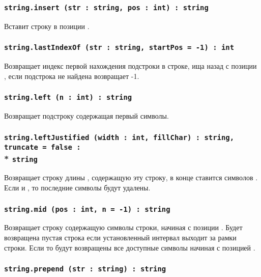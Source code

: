 \subsubsection{\lstinline|string.insert (str : string, pos : int) : string|}

Вставит строку  в позиции .

\subsubsection{\lstinline|string.lastIndexOf (str : string, startPos = -1) : int|}

Возвращает индекс первой нахождения подстроки  в строке, ища назад с позиции , если подстрока не найдена возвращает -1.

\subsubsection{\lstinline|string.left (n : int) : string|}

Возвращает подстроку содержащая первый  символы.

\subsubsection{\lstinline|string.leftJustified (width : int, fillChar) : string, truncate = false :|\\* \lstinline|string|}

Возвращает строку длины , содержащую эту строку, в конце ставится  символов . Если  и , то последние  символы будут удалены.

\subsubsection{\lstinline|string.mid (pos : int, n = -1) : string|}

Возвращает строку содержащую  символы строки, начиная с позиции . Будет возвращена пустая строка если установленный интервал выходит за рамки строки. Если  то будут возвращены все доступные символы начиная с позицией .

\subsubsection{\lstinline|string.prepend (str : string) : string|}

